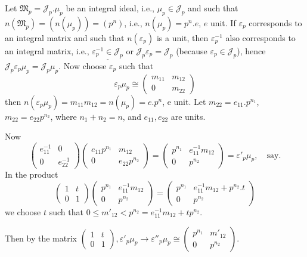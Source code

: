 Let $\mathfrak{M}_p = \mathcal{J}_p. \mu_p$ be an integral ideal,
i.e., $\mu_p \in \mathcal{J}_p$ and such that $n(\mathfrak{M}_p) =
(n(\mu_p)) = (p^n)$,  i.e., $n(\mu_p) = p^n$.$e$, $e$ unit. If
$\varepsilon_p$ corresponds to an integral matrix and such  that
$n(\varepsilon_p)$ is a unit, then $\varepsilon^{-1}_p$ also
corresponds to an integral matrix, i.e.,
$\underline{\varepsilon^{-1}_p \in \mathcal{J}_p}$ or $\mathcal{J}_p
\varepsilon_p = \mathcal{J}_p$ (because $\varepsilon_p \in
\mathcal{J}_p$), hence $\mathcal{J}_p \varepsilon_p \mu_p =
\mathcal{J}_p \mu_p$. Now choose $\varepsilon_p$ such that 
\begin{equation*}
  \varepsilon_p \mu_p \cong
  \begin{pmatrix}
    m_{11} & m_{12}\\ 
    0 & m_{22}
  \end{pmatrix}
\end{equation*}
then $n(\varepsilon_p \mu_p) = m_{11} m_{12} = n(\mu_p) = e.p^n$, e
unit. Let $m_{22} = e_{11}. p^{n_1}$,  $m_{22} = e_{22} p^{n_2}$, where
$n_1 + n_2 = n$, and $e_{11}, e_{22}$ are units.

Now
$$
\begin{pmatrix} e^{-1}_{11} & 0 \\  0 & e^{-1}_{22} \end{pmatrix} 
\begin{pmatrix} e_{11} p^{n_1} & m_{12}\\ 0 &  e_{22}p^{n_2}\end{pmatrix} = 
\begin{pmatrix} p^{n_1}& e^{-1}_{11} m_{12} \\ 0 &  p^{n_2} \end{pmatrix} = 
\varepsilon'_p \mu_p, \quad \text{say}. 
$$
In the product 
$$
\begin{pmatrix} 1 & t \\ 0 & 1\end{pmatrix} 
  \begin{pmatrix} p^{n_1} & e^{-1}_{11} m_{12} \\ 0&  p^{n_2} \end{pmatrix}
  = \begin{pmatrix}p^{n_1} & e^{-1}_{11}m_{12}+ p^{n_2}.t\\ 0& p^{n_2} \end{pmatrix} 
$$
we choose $t$ such that $0 \le m'_{12} < p^{n_2} = e^{-1}_{11} m_{12} + tp^{n_2}$.

Then by the matrix $\begin{pmatrix}1&  t \\ 0 & 1 \end{pmatrix},
\varepsilon'_p \mu_p \rightarrow \varepsilon''_p \mu_p
\cong \begin{pmatrix} p^{n_1} &  m'_{12} \\ 0 &
  p^{n_2} \end{pmatrix}$. 

